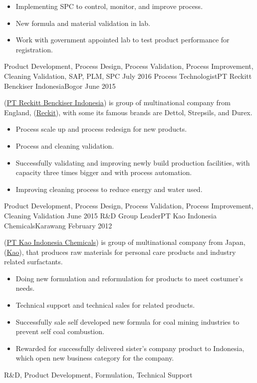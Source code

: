 \begin{experiences}
{\begin{itemize}
                        \item Implementing SPC to control, monitor, and improve process.
                        \item New formula and material validation in lab. 
                        \item Work with government appointed lab to test product performance for registration.
                      \end{itemize}
                    }
                    {Product Development, Process Design, Process Validation, Process Improvement, Cleaning Validation, SAP, PLM, SPC}
  \emptySeparator
  \experience
    {July 2016} {Process Technologist}{PT Reckitt Benckiser Indonesia}{Bogor}
    {June 2015} {(\href{https://www.reckitt.com/}{PT Reckitt Benckiser Indonesia}) is group of multinational company from England, (\href{https://www.reckitt.com/}{Reckit}), with some its famous brands are Dettol, Strepsils, and Durex.
                      \begin{itemize}
                        \item Process scale up and process redesign for new products.        
                        \item Process and cleaning validation.
                        \item Successfully validating and improving newly build production facilities, with capacity three times bigger and with process automation.
                        \item Improving cleaning process to reduce energy and water used.
                      \end{itemize}
                    }
                    {Product Development, Process Design, Process Validation, Process Improvement, Cleaning Validation}
  \emptySeparator
  \experience
  {June 2015} {R\&D Group Leader}{PT Kao Indonesia Chemicals}{Karawang}
    {February 2012} {(\href{https://chemical.kao.com/id/}{PT Kao Indonesia Chemicals}) is group of multinational company from Japan, (\href{https://chemical.kao.com/global/}{Kao}), that produces raw materials for personal care products and industry related surfactants.
                      \begin{itemize}
                        \item Doing new formulation and reformulation for products to meet costumer’s needs.        
                        \item Technical support and technical sales for related products.
                        \item Successfully sale self developed new formula for coal mining industries to prevent self coal combustion.
                        \item Rewarded for successfully delivered sister’s company product to Indonesia, which open new business category for the company.
                      \end{itemize}
                    }
                    {R\&D, Product Development, Formulation, Technical Support}
\end{experiences}

